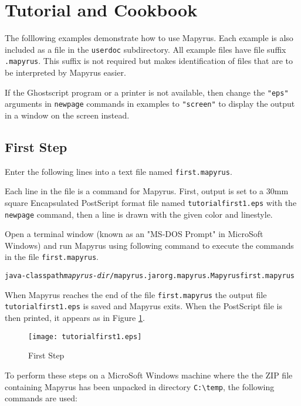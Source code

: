 
\section{Tutorial and Cookbook}

The folllowing examples demonstrate how to use Mapyrus.  Each example is also
included as a file in the \texttt{userdoc} subdirectory.  All example files
have file suffix \texttt{.mapyrus}.  This suffix is not required but makes
identification of files that are to be interpreted by Mapyrus easier.

If the Ghostscript program or a printer is not available, then change the
\texttt{"eps"} arguments in \texttt{newpage} commands in examples to
\texttt{"screen"}
to display the output in a window on the screen instead.

\subsection{First Step}

Enter the following lines into a text file named \texttt{first.mapyrus}.



Each line in the file is a command for Mapyrus.  First, output is set to
a 30mm square Encapsulated PostScript format file named
\texttt{tutorialfirst1.eps} with the \texttt{newpage} command, then a
line is drawn with the given color and linestyle.

Open a terminal window (known as an "MS-DOS Prompt" in MicroSoft Windows)
and run Mapyrus using following command to execute the
commands in the file \texttt{first.mapyrus}.

\begin{alltt}
java -classpath \textit{mapyrus-dir}/mapyrus.jar org.mapyrus.Mapyrus first.mapyrus
\end{alltt}

When Mapyrus reaches the end of the file \texttt{first.mapyrus}
the output file \texttt{tutorialfirst1.eps} is saved and Mapyrus exits.
When the PostScript file is then printed, it appears as in
Figure \ref{tutorialfirst1}.

\begin{figure}[htb]
\texttt{[image: tutorialfirst1.eps]}
\caption{First Step}
\label{tutorialfirst1}
\end{figure}

To perform these steps on a MicroSoft Windows machine where the
the ZIP file containing Mapyrus has been unpacked in directory
\texttt{C:\textbackslash{}temp},
the following commands are used:

